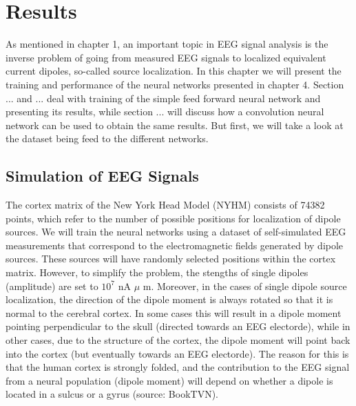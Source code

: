 \documentclass[a4paper, UKenglish, 11pt]{uiomaster}
\begin{document}
\chapter{Results}
As mentioned in chapter 1, an important topic in EEG signal analysis is the inverse problem of going from measured EEG signals to localized equivalent current dipoles, so-called source localization. In this chapter we will present the training and performance of the neural networks presented in chapter 4. Section ... and ... deal with training of the simple feed forward neural network and presenting its results, while section ... will discuss how a convolution neural network can be used to obtain the same results. But first, we will take a look at the dataset being feed to the different networks.

\section{Simulation of EEG Signals}
The cortex matrix of the New York Head Model (NYHM) consists of 74382 points, which refer to the number of possible positions for localization of dipole sources. We will train the neural networks using a dataset of self-simulated EEG measurements that correspond to the electromagnetic fields generated by dipole sources. These sources will have randomly selected positions within the cortex matrix. However, to simplify the problem, the stengths of single dipoles (amplitude) are set to $10^7$ nA $\mu$ m. Moreover, in the cases of single dipole source localization, the direction of the dipole moment is always rotated so that it is normal to the cerebral cortex. In some cases this will result in a dipole moment pointing perpendicular to the skull (directed towards an EEG electorde), while in other cases, due to the structure of the cortex, the dipole moment will point back into the cortex (but eventually towards an EEG electorde). The reason for this is that the human cortex is strongly folded, and the contribution to the EEG signal from a neural population (dipole moment) will depend on whether a dipole is located in a sulcus or a gyrus (source: BookTVN).
\\
\\
\end{document}

